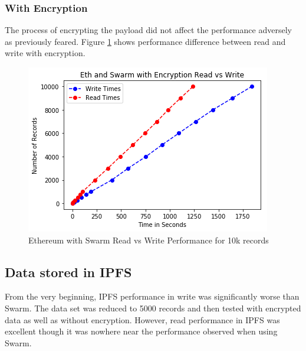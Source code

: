 \documentclass[11pt,openright]{report}
\begin{document}
\subsubsection{With Encryption}
The process of encrypting the payload did not affect the performance adversely as previously feared. Figure \ref{fig:graph_eth_swarm_encr_readvwrite} shows performance difference between read and write with encryption.
\newline
\newline
\begin{figure}[!htbp]
    \centering
    \includegraphics[scale=1]{results/graphs/Eth_Swarm_Read_v_Write_Encr.png}
    \caption{Ethereum with Swarm Read vs Write Performance for 10k records}
    \label{fig:graph_eth_swarm_encr_readvwrite}
\end{figure}
\newline
\newline
\subsection{Data stored in IPFS}
From the very beginning, IPFS performance in write was significantly worse than Swarm. The data set was reduced to 5000 records and then tested with encrypted data as well as without encryption. However, read performance in IPFS was excellent though it was nowhere near the performance observed when using Swarm.
\end{document}
